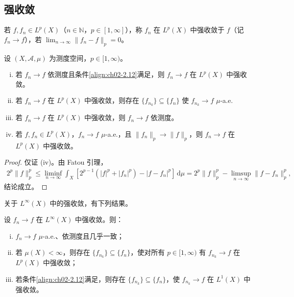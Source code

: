 \documentclass[../../main.tex]{subfiles}%
\begin{document}
\subsection{强收敛}\label{subsection:ch02-强收敛}

若 $f,f_n\in L^p(X)$（$n\in\mathbb N$，$p\in[1,\infty]$），称 $f_n$ 在 $L^p(X)$ 中强收敛于 $f$（记 $f_n\to f$），若 $\lim_{n\to\infty}\|f_n-f\|_p=0$。

\begin{proposition}\label{proposition:ch02-强收敛性质}
设 $(X,\mathscr A,\mu)$ 为测度空间，$p\in[1,\infty)$。
\begin{enumerate}[(i)]
\item 若 $f_n\to f$ 依测度且条件\eqref{align:ch02-2.12}满足，则 $f_n\to f$ 在 $L^p(X)$ 中强收敛。
\item 若 $f_n\to f$ 在 $L^p(X)$ 中强收敛，则存在 $\{f_{n_k}\}\subseteq\{f_n\}$ 使 $f_{n_k}\to f$ $\mu$-a.e.
\item 若 $f_n\to f$ 在 $L^p(X)$ 中强收敛，则 $f_n\to f$ 依测度。
\item 若 $f,f_n\in L^p(X)$，$f_n\to f$ $\mu$-a.e.，且 $\|f_n\|_p\to\|f\|_p$，则 $f_n\to f$ 在 $L^p(X)$ 中强收敛。
\end{enumerate}
\end{proposition}

\begin{proof}
仅证 (iv)。由 Fatou 引理，
\begin{align*}
2^p\|f\|_p^p\leqslant\liminf_{n\to\infty}\int_X[2^{p-1}(|f|^p+|f_n|^p)-|f-f_n|^p]\,\mathrm{d}\mu
=2^p\|f\|_p^p-\limsup_{n\to\infty}\|f-f_n\|_p^p,
\end{align*}
结论成立。
\end{proof}

关于 $L^\infty(X)$ 中的强收敛，有下列结果。

\begin{proposition}\label{proposition:ch02-Linfty强收敛}
设 $f_n\to f$ 在 $L^\infty(X)$ 中强收敛。则：
\begin{enumerate}[(i)]
\item $f_n\to f$ $\mu$-a.e.、依测度且几乎一致；
\item 若 $\mu(X)<\infty$，则存在 $\{f_{n_k}\}\subseteq\{f_n\}$，使对所有 $p\in[1,\infty)$ 有 $f_{n_k}\to f$ 在 $L^p(X)$ 中强收敛；
\item 若条件\eqref{align:ch02-2.12}满足，则存在 $\{f_{n_k}\}\subseteq\{f_n\}$，使 $f_{n_k}\to f$ 在 $L^1(X)$ 中强收敛。
\end{enumerate}
\end{proposition}
\end{document}
